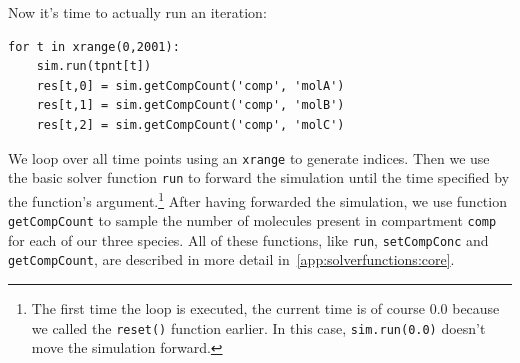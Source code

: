 \documentclass[a4paper,12pt]{book}
\begin{document}
Now it's time to actually run an iteration:
\begin{verbatim}
for t in xrange(0,2001):
    sim.run(tpnt[t])
    res[t,0] = sim.getCompCount('comp', 'molA')
    res[t,1] = sim.getCompCount('comp', 'molB')
    res[t,2] = sim.getCompCount('comp', 'molC')
\end{verbatim}
We loop over all time points using an \texttt{xrange} to generate indices. Then we use the basic solver function \texttt{run} to forward the simulation until the time specified by the function's argument.\footnote{The first time the loop is executed, the current time is of course 0.0 because we called the \texttt{reset()} function earlier. In this case, \texttt{sim.run(0.0)} doesn't move the simulation forward.} After having forwarded the simulation, we use function \texttt{getCompCount} to sample the number of molecules present in compartment \texttt{comp} for each of our three species. All of these functions, like \texttt{run}, \texttt{setCompConc} and \texttt{getCompCount}, are described in more detail in~\ref{app:solverfunctions:core}.
\end{document}
